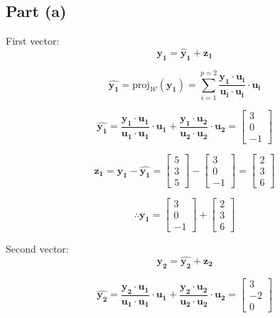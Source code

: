 \documentclass{article}
\begin{document}
\subsection{Part (a)} 

First vector:
\[%
    \mathbf{y_1}
    =
    \mathbf{\hat{y}_{1}}+\mathbf{z_1}
\]%


\[%
    \mathbf{\hat{y_1}}
    =
    \text{proj}_{\mathcal{W}}\left(\mathbf{y_1}\right)
    =
    \sum_{i=1}^{p=2} 
    \frac{\mathbf{y_1} \cdot \mathbf{u_i} }{\mathbf{u_i} \cdot
    \mathbf{u_i}}  \cdot \mathbf{u_i}
\]%



\[%
    \mathbf{\hat{y_1}}
    =
    \frac{\mathbf{y_1} \cdot \mathbf{u_1} }{\mathbf{u_1} \cdot
    \mathbf{u_1}}  \cdot \mathbf{u_1}
    +
    \frac{\mathbf{y_1} \cdot \mathbf{u_2} }{\mathbf{u_2} \cdot
    \mathbf{u_2}}  \cdot \mathbf{u_2}
    =
    \begin{bmatrix}3\\0\\-1\end{bmatrix}
\]%


\[%
    \mathbf{z_1}
    =
    \mathbf{y_1}-\mathbf{\hat{y_1}}
    =
    \begin{bmatrix}5\\3\\5\end{bmatrix}
    -
    \begin{bmatrix}3\\0\\-1\end{bmatrix}
    =
    \begin{bmatrix}2\\3\\6\end{bmatrix}
\]%

\[%
     \therefore \mathbf{y_1} = 
     \begin{bmatrix}3\\0\\-1\end{bmatrix}
     +
     \begin{bmatrix}2\\3\\6\end{bmatrix}
\]%


Second vector:
\[%
    \mathbf{y_2}
    =
    \mathbf{\hat{y_2}}
    +
    \mathbf{z_2}
\]%

\[%
    \mathbf{\hat{y_2}}
    =
    \frac{\mathbf{y_2} \cdot \mathbf{u_1} }{\mathbf{u_1} \cdot
    \mathbf{u_1}}  \cdot \mathbf{u_1}
    +
    \frac{\mathbf{y_2} \cdot \mathbf{u_2} }{\mathbf{u_2} \cdot
    \mathbf{u_2}}  \cdot \mathbf{u_2}
    =
    \begin{bmatrix}3\\-2\\0\end{bmatrix}
\]%
\end{document}
